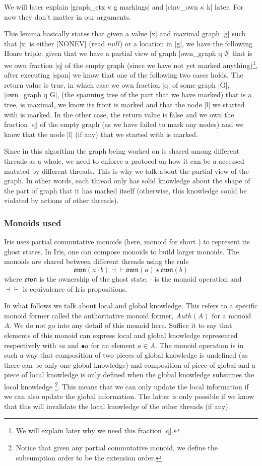 \documentclass[]{scrartcl}
\newcommand{\Auth}{\mathit{Auth}}
\newcommand{\own}{\mathfrak{own}}
\begin{document}
We will later explain \Coqe|graph_ctx $\kappa$ g markings| and
\Coqe|cinv_own $\kappa$ k| later. For now they don't matter in our
arguments.

This lemma basically states that given a value \Coqe|x| and maximal graph
\Coqe|g| such that \Coqe|x| is either \Coqe|NONEV| (read $\mathit{null}$) or a location in \Coqe|g|, we have the following Hoare triple:
given that we have a partial view of graph \Coqe|own_graph q $\emptyset$| that is we own fraction \Coqe|q| of the empty graph
(since we have not yet marked anything)\footnote {We will explain later why we need this fraction \Coqe|q|.}, after executing \Coqe|span|
we know that one of the following two cases holds.
The return value is true, in which case we own fraction \Coqe|q| of some
graph \Coqe|G|, \Coqe|own_graph q G|, (the spanning tree of the part that we have marked) that
is a tree, is maximal, we know its front is marked and that the node \Coqe|l| we started with is marked.
In the other case, the return value is false and we own the fraction \Coqe|q| of the empty graph (as we have failed to mark any nodes)
and we know that the node \Coqe|l| (if any) that we started with is marked.

Since in this algorithm the graph being worked on is shared among different threads as a whole, we need to enforce a protocol on how it
can be a accessed mutated by different threads.
This is why we talk about the partial view of the graph.
In other words, each thread only has solid knowledge about the shape of
the part of graph that it has marked itself (otherwise, this knowledge could be violated by actions of other threads).

\subsubsection{Monoids used}
Iris uses partial commutative monoids (here, monoid for short ) to represent its ghost states.
In Iris, one can compose monoids to build larger monoids.
The monoids are shared between different threads using the rule
\[
\own(a \cdot b) \dashv\vdash \own(a) \star \own(b)
\]
where $\own$ is the ownership of the ghost state, $\cdot$ is the monoid
operation and $\dashv\vdash$ is equivalence of Iris propositions.

In what follows we talk about local and global knowledge.
This refers to a specific monoid former called the authoritative
monoid former, $\Auth(A)$ for a monoid $A$.
We do not go into any detail of this monoid here.
Suffice it to say that elements of this monoid can express local and
global knowledge represented respectively with $\circ a$ and $\bullet a$
for an element $a \in A$.
The monoid operation is in such a way that composition of two
pieces of global knowledge is undefined (as there can be only one global knowledge) and composition of piece of global and a piece of local knowledge
is only defined when the global knowledge subsumes the local knowledge \footnote{Notice that given any partial commutative monoid, we define the subsumption order to be the extension order.}.
This means that we can only update the local information if we can also
update the global information.
The latter is only possible if we know that this will invalidate the local
knowledge of the other threads (if any).
\end{document}
